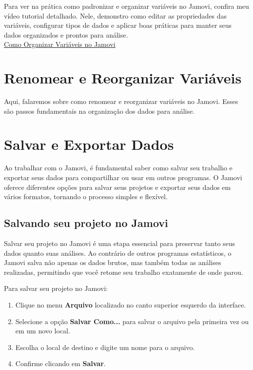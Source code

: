 \begin{tcolorbox}[colback=white,colframe=red,title={\faPlayCircle \ Dica de Conteúdo}]
  Para ver na prática como padronizar e organizar variáveis no Jamovi, confira meu vídeo tutorial detalhado. Nele, demonstro como editar as propriedades das variáveis, configurar tipos de dados e aplicar boas práticas para manter seus dados organizados e prontos para análise.\\
  \textcolor{red}{\faYoutube} \href{https://youtu.be/PJkwPRLT_Q4?si=Ks8_3O7Ok5f-c6Bn}{Como Organizar Variáveis no Jamovi}
\end{tcolorbox}


\section{Renomear e Reorganizar Variáveis}
Aqui, falaremos sobre como renomear e reorganizar variáveis no Jamovi. Esses são passos fundamentais na organização dos dados para análise.

\section{Salvar e Exportar Dados}

Ao trabalhar com o Jamovi, é fundamental saber como salvar seu trabalho e exportar seus dados para compartilhar ou usar em outros programas. O Jamovi oferece diferentes opções para salvar seus projetos e exportar seus dados em vários formatos, tornando o processo simples e flexível.

\subsection{Salvando seu projeto no Jamovi}

Salvar seu projeto no Jamovi é uma etapa essencial para preservar tanto seus dados quanto suas análises. Ao contrário de outros programas estatísticos, o Jamovi salva não apenas os dados brutos, mas também todas as análises realizadas, permitindo que você retome seu trabalho exatamente de onde parou.

Para salvar seu projeto no Jamovi:

\begin{enumerate}
    \item Clique no menu \textbf{Arquivo} localizado no canto superior esquerdo da interface.
    \item Selecione a opção \textbf{Salvar Como...} para salvar o arquivo pela primeira vez ou em um novo local.
    \item Escolha o local de destino e digite um nome para o arquivo.
    \item Confirme clicando em \textbf{Salvar}.
\end{enumerate}

